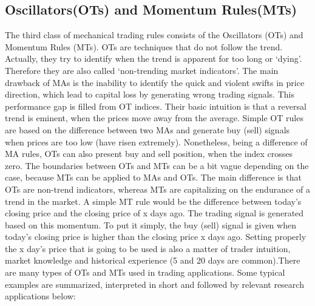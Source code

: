 \documentclass[12pt]{article}
\begin{document}
	\subsection{Oscillators(OTs) and Momentum Rules(MTs)}
	The third class of mechanical trading rules consists of the Oscillators (OTs) and Momentum Rules
	(MTs). OTs are techniques that do not follow the trend. Actually, they try to identify when the trend
	is apparent for too long or ‘dying’. Therefore they are also called ‘non-trending market indicators’.
	The main drawback of MAs is the inability to identify the quick and violent swifts in price
	direction, which lead to capital loss by generating wrong trading signals. This performance gap is
	filled from OT indices. Their basic intuition is that a reversal trend is eminent, when the prices
	move away from the average. Simple OT rules are based on the difference between two MAs and
	generate buy (sell) signals when prices are too low (have risen extremely). Nonetheless, being a
	difference of MA rules, OTs can also present buy and sell position, when the index crosses zero.
	The boundaries between OTs and MTs can be a bit vague depending on the case, because MTs can
	be applied to MAs and OTs. The main difference is that OTs are non-trend indicators, whereas MTs
	are capitalizing on the endurance of a trend in the market. A simple MT rule would be the
	difference between today’s closing price and the closing price of x days ago. The trading signal is
	generated based on this momentum. To put it simply, the buy (sell) signal is given when today’s
	closing price is higher than the closing price x days ago. Setting properly the x day’s price that is
	going to be used is also a matter of trader intuition, market knowledge and historical experience (5
	and 20 days are common).There are many types of OTs and MTs used in trading applications. Some typical examples are
	summarized, interpreted in short and followed by relevant research applications below:
	
\end{document}
